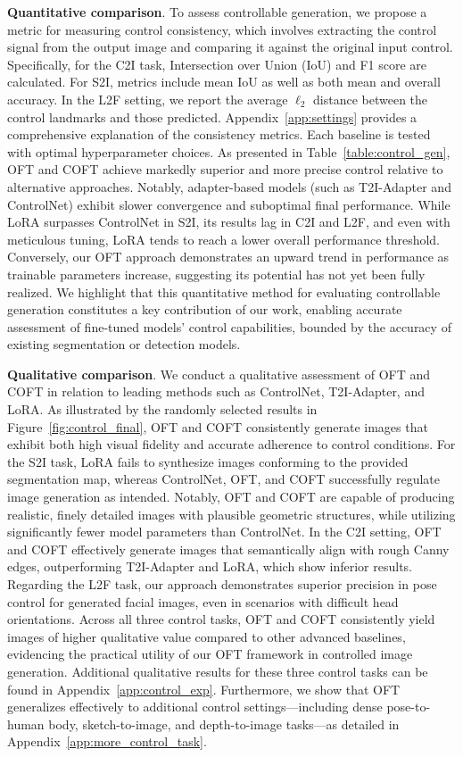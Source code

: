 \textbf{Quantitative comparison}. To assess controllable generation, we propose a metric for measuring control consistency, which involves extracting the control signal from the output image and comparing it against the original input control. Specifically, for the C2I task, Intersection over Union (IoU) and F1 score are calculated. For S2I, metrics include mean IoU as well as both mean and overall accuracy. In the L2F setting, we report the average $\ell_2$ distance between the control landmarks and those predicted. Appendix~\ref{app:settings} provides a comprehensive explanation of the consistency metrics. Each baseline is tested with optimal hyperparameter choices. As presented in Table~\ref{table:control_gen}, OFT and COFT achieve markedly superior and more precise control relative to alternative approaches. Notably, adapter-based models (such as T2I-Adapter and ControlNet) exhibit slower convergence and suboptimal final performance. While LoRA surpasses ControlNet in S2I, its results lag in C2I and L2F, and even with meticulous tuning, LoRA tends to reach a lower overall performance threshold. Conversely, our OFT approach demonstrates an upward trend in performance as trainable parameters increase, suggesting its potential has not yet been fully realized. We highlight that this quantitative method for evaluating controllable generation constitutes a key contribution of our work, enabling accurate assessment of fine-tuned models’ control capabilities, bounded by the accuracy of existing segmentation or detection models.

\textbf{Qualitative comparison}. We conduct a qualitative assessment of OFT and COFT in relation to leading methods such as ControlNet, T2I-Adapter, and LoRA. As illustrated by the randomly selected results in Figure~\ref{fig:control_final}, OFT and COFT consistently generate images that exhibit both high visual fidelity and accurate adherence to control conditions. For the S2I task, LoRA fails to synthesize images conforming to the provided segmentation map, whereas ControlNet, OFT, and COFT successfully regulate image generation as intended. Notably, OFT and COFT are capable of producing realistic, finely detailed images with plausible geometric structures, while utilizing significantly fewer model parameters than ControlNet. In the C2I setting, OFT and COFT effectively generate images that semantically align with rough Canny edges, outperforming T2I-Adapter and LoRA, which show inferior results. Regarding the L2F task, our approach demonstrates superior precision in pose control for generated facial images, even in scenarios with difficult head orientations. Across all three control tasks, OFT and COFT consistently yield images of higher qualitative value compared to other advanced baselines, evidencing the practical utility of our OFT framework in controlled image generation. Additional qualitative results for these three control tasks can be found in Appendix~\ref{app:control_exp}. Furthermore, we show that OFT generalizes effectively to additional control settings—including dense pose-to-human body, sketch-to-image, and depth-to-image tasks—as detailed in Appendix~\ref{app:more_control_task}.

